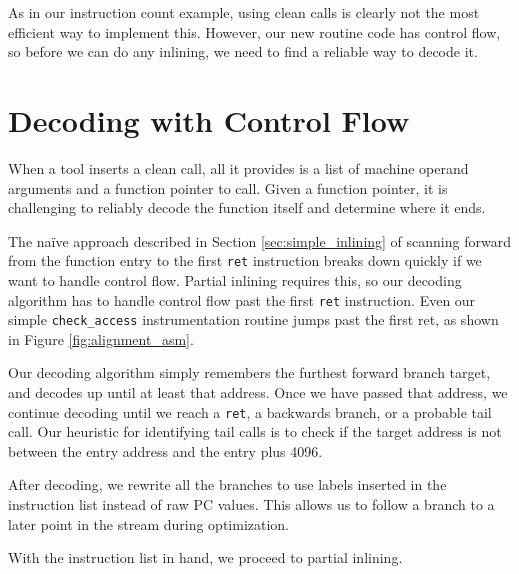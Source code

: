 As in our instruction count example, using clean calls is clearly not the most
efficient way to implement this.  However, our new routine code has control
flow, so before we can do any inlining, we need to find a reliable way to decode
it.

\section{Decoding with Control Flow}
\label{sec:decoding_cti}

When a tool inserts a clean call, all it provides is a list of machine operand
arguments and a function pointer to call.  Given a function pointer, it is
challenging to reliably decode the function itself and determine where it ends.

The na\"ive approach described in Section \ref{sec:simple_inlining} of scanning
forward from the function entry to the first {\tt ret} instruction breaks down
quickly if we want to handle control flow.  Partial inlining requires this, so
our decoding algorithm has to handle control flow past the first {\tt ret}
instruction.  Even our simple {\tt check\_access} instrumentation routine
jumps past the first ret, as shown in Figure \ref{fig:alignment_asm}.

Our decoding algorithm simply remembers the furthest forward branch target, and
decodes up until at least that address.  Once we have passed that address, we
continue decoding until we reach a {\tt ret}, a backwards branch, or a probable
tail call.  Our heuristic for identifying tail calls is to check if the target
address is not between the entry address and the entry plus 4096.

After decoding, we rewrite all the branches to use labels inserted in the
instruction list instead of raw PC values.  This allows us to follow a branch to
a later point in the stream during optimization.

With the instruction list in hand, we proceed to partial inlining.

